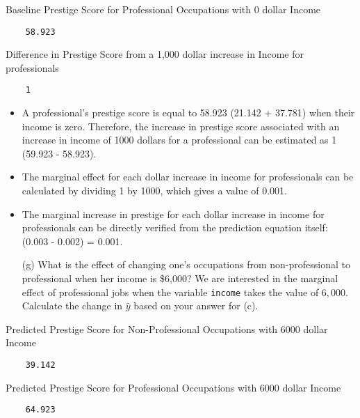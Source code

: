 \documentclass[12pt,letterpaper]{article}
\begin{document}
\noindent Baseline Prestige Score for Professional Occupations with 0 dollar Income

\begin{verbatim}
	58.923
\end{verbatim}

\noindent Difference in Prestige Score from a 1,000 dollar increase in Income for professionals

\begin{verbatim}
	1
\end{verbatim}

\begin{itemize}[left=0pt]
	\item 
	A professional's prestige score is equal to 58.923 (21.142 + 37.781) when their income is zero. Therefore, the increase in prestige score associated with an increase in income of 1000 dollars for a professional can be estimated as 1 (59.923 - 58.923). 
	\item 
	The marginal effect for each dollar increase in income for professionals can be calculated by dividing 1 by 1000, which gives a value of 0.001. 
	\item 
	The marginal increase in prestige for each dollar increase in income for professionals can be directly verified from the prediction equation itself: (0.003 - 0.002) = 0.001.
\end{itemize}

\newpage
\begin{enumerate}
	\item [(g)]
	What is the effect of changing one's occupations from non-professional to professional when her income is \$6,000? We are interested in the marginal effect of professional jobs when the variable \texttt{income} takes the value of $6,000$. Calculate the change in $\hat{y}$ based on your answer for (c).
\end{enumerate}

\noindent Predicted Prestige Score for Non-Professional Occupations with 6000 dollar Income

\begin{verbatim}
	39.142
\end{verbatim}

\noindent Predicted Prestige Score for Professional Occupations with 6000 dollar Income

\begin{verbatim}
	64.923
\end{verbatim}
\end{document}
